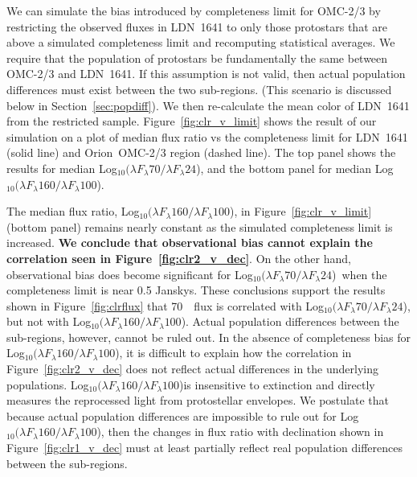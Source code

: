 \documentclass[manuscript]{aastex61}
\newcommand{\clra}{Log$_{10}(\lambda F_\lambda70/\lambda F_\lambda24$)}
\newcommand{\clrb}{Log$_{10}(\lambda F_\lambda160/\lambda F_\lambda100$)}
\begin{document}
\par
We can simulate the bias introduced by completeness limit for OMC-2/3 by restricting the observed fluxes in LDN~1641 to only those protostars that are above a simulated completeness limit and recomputing statistical averages. We require that the population of protostars be fundamentally the same between OMC-2/3 and LDN~1641. If this assumption is not valid, then actual population differences must exist between the two sub-regions. (This scenario is discussed below in Section~\ref{sec:popdiff}).  We then re-calculate the mean color of LDN~1641 from the restricted sample. Figure~\ref{fig:clr_v_limit} shows the result of our simulation on a plot of median flux ratio vs the completeness limit for LDN~1641 (solid line) and Orion~OMC-2/3 region (dashed line). The top panel shows the results for median \clra, and the bottom panel for median \clrb.
\par
The median flux ratio, \clrb, in Figure~\ref{fig:clr_v_limit} (bottom panel) remains nearly constant as the simulated completeness limit is increased. {\bf We conclude that observational bias cannot explain the correlation seen in Figure~\ref{fig:clr2_v_dec}}. On the other hand, observational bias does become significant for \clra\ when the completeness limit is near 0.5 Janskys. These conclusions support the results shown in Figure~\ref{fig:clrflux} that 70~\micron\ flux is correlated with \clra, but not with \clrb.  Actual population differences between the sub-regions, however, cannot be ruled out. In the absence of completeness bias for \clrb, it is difficult to explain how the correlation in Figure~\ref{fig:clr2_v_dec} does not reflect actual differences in the underlying populations. \clrb is insensitive to extinction and directly measures the reprocessed light from protostellar envelopes.  We postulate that because actual population differences are impossible to rule out for \clrb, then the changes in flux ratio with declination shown in Figure~\ref{fig:clr1_v_dec} must at least partially reflect real population differences between the sub-regions.
\end{document}

